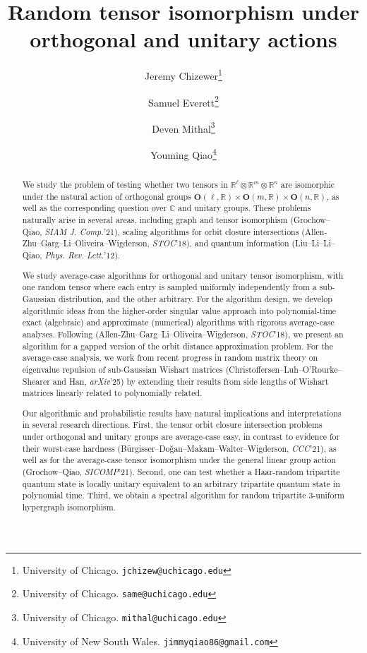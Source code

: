 \documentclass[11pt]{article}
\title{Random tensor isomorphism under orthogonal and unitary actions}
\author{
Jeremy Chizewer\footnote{University of Chicago. \tt{jchizew@uchicago.edu}}
\and 
Samuel Everett\footnote{University of Chicago. \tt{same@uchicago.edu}}
\and 
Deven Mithal\footnote{University of Chicago. \tt{mithal@uchicago.edu}}
\and 
Youming Qiao\footnote{University of New South Wales. \tt{jimmyqiao86@gmail.com}}
}
\numberwithin{equation}{section}
\theoremstyle{remark}
\begin{document}
\maketitle

\begin{abstract}
We study the problem of testing whether two tensors in $\mathbb{R}^\ell\otimes \mathbb{R}^m\otimes \mathbb{R}^n$ are isomorphic under the natural action of orthogonal groups $\textbf{O}(\ell, \mathbb{R})\times\textbf{O}(m, \mathbb{R})\times\textbf{O}(n, \mathbb{R})$, as well as the corresponding question over $\mathbb{C}$ and unitary groups. These problems naturally arise in several areas, including graph and tensor isomorphism (Grochow--Qiao, \emph{SIAM J. Comp.}'21), scaling algorithms for orbit closure intersections (Allen-Zhu--Garg--Li--Oliveira--Wigderson, \emph{STOC}'18), and quantum information (Liu--Li--Li--Qiao, \emph{Phys. Rev. Lett.}'12). 

We study average-case algorithms for orthogonal and unitary tensor isomorphism, with one random tensor where each entry is sampled uniformly independently from a sub-Gaussian distribution, and the other arbitrary. For the algorithm design, we develop algorithmic ideas from the higher-order singular value approach into polynomial-time exact (algebraic) and approximate (numerical) algorithms with rigorous average-case analyses. Following (Allen-Zhu--Garg--Li--Oliveira--Wigderson, \emph{STOC}'18), we present an algorithm for a gapped version of the orbit distance approximation problem.
For the average-case analysis, we work from recent progress in random matrix theory on eigenvalue repulsion of sub-Gaussian Wishart matrices (Christoffersen--Luh--O’Rourke--Shearer and Han, \emph{arXiv}'25) by extending their results from side lengths of Wishart matrices linearly related to polynomially related.

Our algorithmic and probabilistic results have natural implications and interpretations in several research directions. First, the tensor orbit closure intersection problems under orthogonal and unitary groups are average-case easy, in contrast to evidence for their worst-case hardness (B\"urgisser--Do\u{g}an--Makam--Walter--Wigderson, \emph{CCC}'21), as well as for the average-case tensor isomorphism under the general linear group action (Grochow--Qiao, \emph{SICOMP}'21). Second, one can test whether a Haar-random tripartite quantum state is locally unitary equivalent to an arbitrary tripartite quantum state in polynomial time. Third, we obtain a spectral algorithm for random tripartite 3-uniform hypergraph isomorphism.
\end{abstract}
\end{document}
